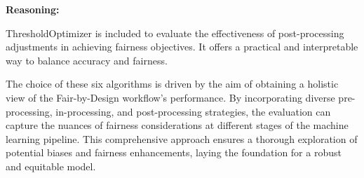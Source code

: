 \textbf{Reasoning:}

ThresholdOptimizer is included to evaluate the effectiveness of post-processing adjustments in achieving fairness objectives. It offers a practical and interpretable way to balance accuracy and fairness.

The choice of these six algorithms is driven by the aim of obtaining a holistic view of the Fair-by-Design workflow's performance. By incorporating diverse pre-processing, in-processing, and post-processing strategies, the evaluation can capture the nuances of fairness considerations at different stages of the machine learning pipeline. This comprehensive approach ensures a thorough exploration of potential biases and fairness enhancements, laying the foundation for a robust and equitable model.

